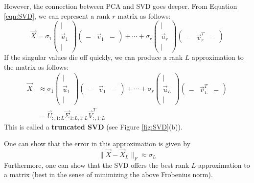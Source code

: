 However, the connection between PCA and SVD goes deeper. From Equation \ref{eqn:SVD}, we can represent a rank $r$ matrix as follows:
\begin{equation*}
\vec{X}=\sigma_1\left(\begin{array}{c} | \\ \vec{u}_1 \\ | \end{array}\right)\left(\begin{array}{ccc} - & \vec{v}_1 & - \end{array}\right)+\cdots+\sigma_r\left(\begin{array}{c} | \\ \vec{u}_r \\ | \end{array}\right)\left(\begin{array}{ccc} - & \vec{v}_r^T & - \end{array}\right)
\end{equation*}
If the singular values die off quickly, we can produce a rank $L$ approximation to the matrix as follows:
\begin{align}
\vec{X} & \approx \sigma_1\left(\begin{array}{c} | \\ \vec{u}_1 \\ | \end{array}\right)\left(\begin{array}{ccc} - & \vec{v}_1 & - \end{array}\right)+\cdots+\sigma_r\left(\begin{array}{c} | \\ \vec{u}_L \\ | \end{array}\right)\left(\begin{array}{ccc} - & \vec{v}_L^T & - \end{array}\right) \nonumber \\
 & = \vec{U}_{:,1:L}\vec{\Sigma}_{1:L,1:L}\vec{V}_{:,1:L}^T
\end{align}
This is called a \textbf{truncated SVD} (see Figure \ref{fig:SVD}(b)).

One can show that the error in this approximation is given by
\begin{equation}
\lVert \vec{X}-\vec{X}_L \rVert_F \approx \sigma_L
\end{equation}
Furthermore, one can show that the SVD offers the best rank $L$ approximation to a matrix (best in the sense of minimizing the above Frobenius norm).

